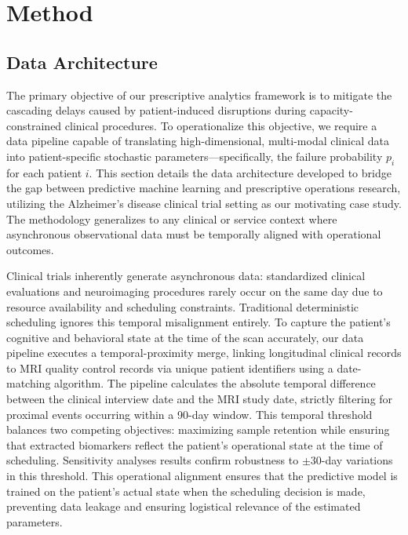 \documentclass[11pt,a4paper]{article}
\begin{document}
\section{Method}


\subsection{Data Architecture}
\label{sec:data_architecture}

The primary objective of our prescriptive analytics framework is to mitigate the cascading delays caused by patient-induced disruptions during capacity-constrained clinical procedures. To operationalize this objective, we require a data pipeline capable of translating high-dimensional, multi-modal clinical data into patient-specific stochastic parameters---specifically, the failure probability $p_i$ for each patient $i$. This section details the data architecture developed to bridge the gap between predictive machine learning and prescriptive operations research, utilizing the Alzheimer's disease clinical trial setting as our motivating case study. The methodology generalizes to any clinical or service context where asynchronous observational data must be temporally aligned with operational outcomes.

Clinical trials inherently generate asynchronous data: standardized clinical evaluations and neuroimaging procedures rarely occur on the same day due to resource availability and scheduling constraints. Traditional deterministic scheduling ignores this temporal misalignment entirely. To capture the patient's cognitive and behavioral state at the time of the scan accurately, our data pipeline executes a temporal-proximity merge, linking longitudinal clinical records to MRI quality control records via unique patient identifiers using a date-matching algorithm. The pipeline calculates the absolute temporal difference between the clinical interview date and the MRI study date, strictly filtering for proximal events occurring within a 90-day window. This temporal threshold balances two competing objectives: maximizing sample retention while ensuring that extracted biomarkers reflect the patient's operational state at the time of scheduling. Sensitivity analyses results confirm robustness to $\pm$30-day variations in this threshold. This operational alignment ensures that the predictive model is trained on the patient's actual state when the scheduling decision is made, preventing data leakage and ensuring logistical relevance of the estimated parameters.
\end{document}

